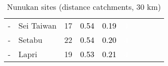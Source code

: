 \begin{table}[ht]
\begin{tabular}{C{0.03\textwidth}C{0.12\textwidth}C{0.09\textwidth}C{0.08\textwidth}C{0.08\textwidth}C{0.08\textwidth}C{0.07\textwidth}C{0.07\textwidth}C{0.07\textwidth}C{0.07\textwidth}}
  {-} & Sei Taiwan &  17 & \textcolor[HTML]{000000}{0.54} & \textcolor[HTML]{000000}{0.19} & \textcolor[HTML]{FFFFFF}{4} &  &  &  &  \\ 
  {-} & Setabu &  22 & \textcolor[HTML]{000000}{0.54} & \textcolor[HTML]{000000}{0.20} & \textcolor[HTML]{FFFFFF}{4} &  &  &  &  \\ 
  {-} & Lapri &  19 & \textcolor[HTML]{000000}{0.53} & \textcolor[HTML]{000000}{0.21} & \textcolor[HTML]{FFFFFF}{4} &  &  &  &  \\ 
  \end{tabular}
\endgroup
\caption{Nunukan sites (distance catchments, 30 km)} 
\label{tab:nunukan_dist}
\end{table}
